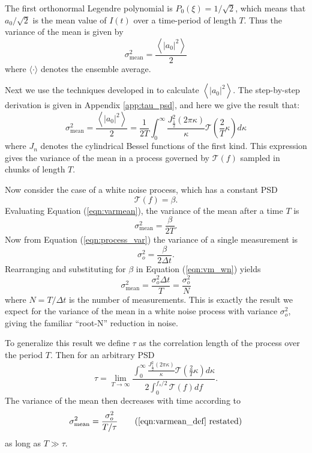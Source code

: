 \documentclass[10pt,preprint]{aastex631}
\begin{document}
The first orthonormal Legendre polynomial is $P_0(\xi) = 1/\sqrt{2}$, which means that $a_0/\sqrt{2}$ is the mean value of $I(t)$ over a time-period of length $T$.  Thus the variance of the mean is given by
\begin{equation}
\sigma_\mathrm{mean}^2 = \frac{\left\langle \left|a_0\right|^2 \right\rangle}{2}
\label{eqn:varmean_def}
\end{equation}
where $\langle \cdot \rangle$ denotes the ensemble average.   

Next we use the techniques developed in \citet{1976JOSA...66..207N} to calculate $\left\langle \left|a_0\right|^2 \right\rangle$. The step-by-step derivation is given in Appendix \ref{app:tau_psd}, and here we give the result that:
\begin{equation}
\sigma_\mathrm{mean}^2 = \frac{\left\langle \left|a_0\right|^2 \right\rangle}{2} = \frac{1}{2T}  \int_0^{\infty} \frac{ J_{\frac{1}{2}}^2(2\pi \kappa)}{\kappa} \mathcal{T}\left( \frac{2}{T} \kappa \right) d\kappa
\label{eqn:varmean}
\end{equation}
where $J_n$ denotes the cylindrical Bessel functions of the first kind.  This expression gives the variance of the mean in a process governed by $\mathcal{T}(f)$ sampled in chunks of length $T$.

Now consider the case of a white noise process, which has a constant PSD
\begin{equation}
\mathcal{T}(f) = \beta.
\end{equation}
Evaluating Equation (\ref{eqn:varmean}), the variance of the mean after a time $T$ is 
\begin{equation}
\sigma_\mathrm{mean}^2 = \frac{\beta}{2T}.
\label{eqn:vm_wn}
\end{equation}
Now from Equation (\ref{eqn:process_var}) the variance of a single measurement is
\begin{equation}
\sigma_o^2  = \frac{\beta}{2\Delta t}.
\end{equation}
Rearranging and substituting for $\beta$ in Equation (\ref{eqn:vm_wn}) yields
\begin{equation}
\sigma_\mathrm{mean}^2 =  \frac{\sigma_o^2 \Delta t}{T} = \frac{\sigma_o^2}{N}
\end{equation}
where $N = T/\Delta t$ is the number of measurements.  This is exactly the result we expect for the variance of the mean in a white noise process with variance $\sigma^2_o$, giving the familiar ``root-N'' reduction in noise.

To generalize this result we define $\tau$ as the correlation length of the process over the period $T$.  Then for an arbitrary PSD
\begin{equation}
\tau = \lim_{T\to\infty}\frac{ \displaystyle\int_0^{\infty} \frac{ J_{\frac{1}{2}}^2(2\pi \kappa)}{\kappa} \mathcal{T}\left( \frac{2}{T} \kappa \right) d\kappa}{ 2 \displaystyle\int_{0}^{f_s/2} \mathcal{T}(f) df}.
\label{eqn:psd_lifetime}
\end{equation}
The variance of the mean then decreases with time according to
\begin{equation}
\sigma_\mathrm{mean}^2 =  \frac{\sigma_o^2}{T/\tau} \tag{\ref{eqn:varmean_def} restated}
\end{equation}
as long as $T \gg \tau$.
\end{document}
